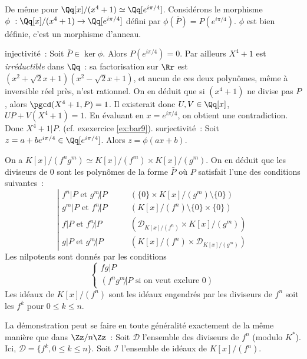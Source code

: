 {\begin{enumerate}
{De même pour $\Qq[x]/(x^{4}+1)\simeq\Qq[e^{i\pi/4}]$. Considérons le
morphisme $\phi~:\Qq[x]/(x^{4}+1)\to\Qq[e^{i\pi/4}]$ défini par
$\phi(\bar P)=P(e^{i\pi/4})$. $\phi$ est bien définie, c'est un morphisme
d'anneau.
\begin{itemize}
injectivité~:
  Soit $\bar{P}\in\ker\phi$. Alors $P(e^{i\pi/4})=0$. Par ailleurs
  $X^{4}+1$ est \emph{irréductible} dans $\Qq$~: sa factorisation sur
  $\Rr$ est $(x^{2}+\sqrt{2}x+1)(x^{2}-\sqrt{2}x+1)$, et aucun de ces
  deux polynômes, même à inversible réel près, n'est rationnel. On en
  déduit que si $(x^{4}+1)$ ne divise pas $P$, alors $\pgcd(X^{4}+1,P)=1$.
  Il existerait donc $U,V\in\Qq[x]$, $UP+V(X^{4}+1)=1$. En évaluant en
  $x=e^{i\pi/4}$, on obtient une contradiction. Donc $X^{4}+1|P$. (cf.
  exexercice \ref{ex:bar9}).
surjectivité~:
  Soit $z=a+be^{i\pi/4}\in\Qq[e^{i\pi/4}]$. Alors $z=\phi(ax+b)$.
\end{itemize}
On a $K[x]/(f^{n}g^{m})\simeq K[x]/(f^{m})\times K[x]/(g^{m})$. On en
  déduit que les diviseurs de $0$ sont les polynômes de la forme
  $\bar{P}$ où $P$ satisfait l'une des conditions suivantes~:
$$
\left|
\begin{array}{ll}
  f^{n}|P \text{ et } g^{m}\!\!\!\not| P & \qquad(\{0\}\times K[x]/(g^{m})\setminus\{0\})\\
  g^{m}|P \text{ et } f^{n}\!\!\!\not| P & \qquad(K[x]/(f^{n})\setminus\{0\}\times \{0\})\\
  f|P \text{ et } f^{n}\!\!\!\not| P & \qquad (\mathcal{D}_{K[x]/(f^{n})}\times K[x]/(g^{m}))\\
  g|P \text{ et } g^{m}\!\!\!\not| P & \qquad (K[x]/(f^{n})\times\mathcal{D}_{ K[x]/(g^{m})})
\end{array}\right.
$$
Les nilpotents sont donnés par les conditions
$$
\left\{
\begin{array}{ll}
  fg|P\\
  (f^{n}g^{m}\!\!\!\not| P \text{ si on veut exclure }0)
\end{array}\right.
$$
Les idéaux de $K[x]/(f^{n})$ sont les idéaux engendrés par les
   diviseurs de $f^{n}$ soit les $f^{k}$ pour $0\leq k\leq n$.

   \smallskip

   La démonstration peut se faire en toute généralité exactement de la
   même manière que dans $\Zz/n\Zz$~: Soit $\mathcal{D}$ l'ensemble des
   diviseurs de $f^{n}$ (modulo $K^{*}$). Ici, $\mathcal{D}=\{f^{k},0\leq
   k\leq n\}$. Soit $\mathcal{I}$ l'ensemble de idéaux de $K[x]/(f^{n})$.

}
\end{enumerate}}
